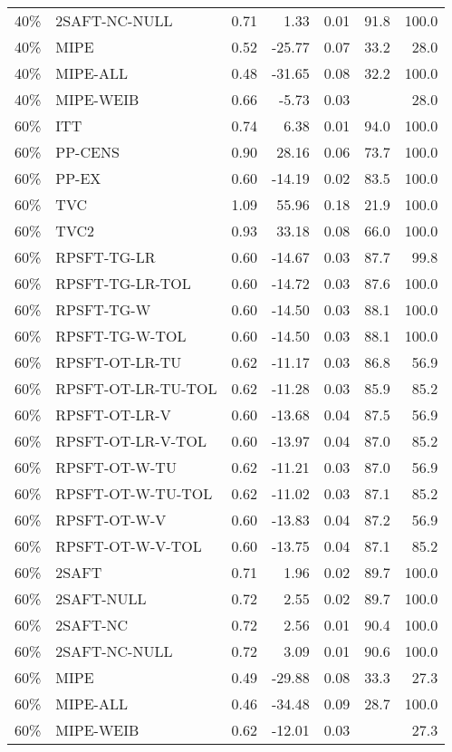 \begin{table}[ht]
{\begin{tabular}{llrrrrr}
  40\% & 2SAFT-NC-NULL & 0.71 & 1.33 & 0.01 & 91.8 & 100.0 \\ 
  40\% & MIPE & 0.52 & -25.77 & 0.07 & 33.2 & 28.0 \\ 
  40\% & MIPE-ALL & 0.48 & -31.65 & 0.08 & 32.2 & 100.0 \\ 
  40\% & MIPE-WEIB & 0.66 & -5.73 & 0.03 &  & 28.0 \\ 
   \hline
60\% & ITT & 0.74 & 6.38 & 0.01 & 94.0 & 100.0 \\ 
  60\% & PP-CENS & 0.90 & 28.16 & 0.06 & 73.7 & 100.0 \\ 
  60\% & PP-EX & 0.60 & -14.19 & 0.02 & 83.5 & 100.0 \\ 
  60\% & TVC & 1.09 & 55.96 & 0.18 & 21.9 & 100.0 \\ 
  60\% & TVC2 & 0.93 & 33.18 & 0.08 & 66.0 & 100.0 \\ 
   \hline
60\% & RPSFT-TG-LR & 0.60 & -14.67 & 0.03 & 87.7 & 99.8 \\ 
  60\% & RPSFT-TG-LR-TOL & 0.60 & -14.72 & 0.03 & 87.6 & 100.0 \\ 
  60\% & RPSFT-TG-W & 0.60 & -14.50 & 0.03 & 88.1 & 100.0 \\ 
  60\% & RPSFT-TG-W-TOL & 0.60 & -14.50 & 0.03 & 88.1 & 100.0 \\ 
  60\% & RPSFT-OT-LR-TU & 0.62 & -11.17 & 0.03 & 86.8 & 56.9 \\ 
  60\% & RPSFT-OT-LR-TU-TOL & 0.62 & -11.28 & 0.03 & 85.9 & 85.2 \\ 
  60\% & RPSFT-OT-LR-V & 0.60 & -13.68 & 0.04 & 87.5 & 56.9 \\ 
  60\% & RPSFT-OT-LR-V-TOL & 0.60 & -13.97 & 0.04 & 87.0 & 85.2 \\ 
   \hline
60\% & RPSFT-OT-W-TU & 0.62 & -11.21 & 0.03 & 87.0 & 56.9 \\ 
  60\% & RPSFT-OT-W-TU-TOL & 0.62 & -11.02 & 0.03 & 87.1 & 85.2 \\ 
  60\% & RPSFT-OT-W-V & 0.60 & -13.83 & 0.04 & 87.2 & 56.9 \\ 
  60\% & RPSFT-OT-W-V-TOL & 0.60 & -13.75 & 0.04 & 87.1 & 85.2 \\ 
   \hline
60\% & 2SAFT & 0.71 & 1.96 & 0.02 & 89.7 & 100.0 \\ 
  60\% & 2SAFT-NULL & 0.72 & 2.55 & 0.02 & 89.7 & 100.0 \\ 
  60\% & 2SAFT-NC & 0.72 & 2.56 & 0.01 & 90.4 & 100.0 \\ 
  60\% & 2SAFT-NC-NULL & 0.72 & 3.09 & 0.01 & 90.6 & 100.0 \\ 
  60\% & MIPE & 0.49 & -29.88 & 0.08 & 33.3 & 27.3 \\ 
  60\% & MIPE-ALL & 0.46 & -34.48 & 0.09 & 28.7 & 100.0 \\ 
  60\% & MIPE-WEIB & 0.62 & -12.01 & 0.03 &  & 27.3 \\ 
   \hline
\end{tabular}
}
\end{table}
